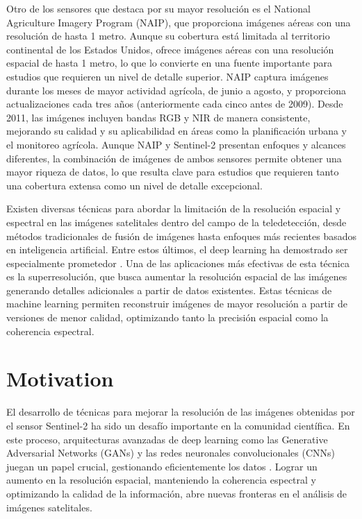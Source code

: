 Otro de los sensores que destaca por su mayor resolución es el National Agriculture Imagery Program (NAIP), que proporciona imágenes aéreas con una resolución de hasta 1 metro. Aunque su cobertura está limitada al territorio continental de los Estados Unidos, ofrece imágenes aéreas con una resolución espacial de hasta 1 metro, lo que lo convierte en una fuente importante para estudios que requieren un nivel de detalle superior. NAIP captura imágenes durante los meses de mayor actividad agrícola, de junio a agosto, y proporciona actualizaciones cada tres años (anteriormente cada cinco antes de 2009). Desde 2011, las imágenes incluyen bandas RGB y NIR de manera consistente, mejorando su calidad y su aplicabilidad en áreas como la planificación urbana y el monitoreo agrícola. Aunque NAIP y Sentinel-2 presentan enfoques y alcances diferentes, la combinación de imágenes de ambos sensores permite obtener una mayor riqueza de datos, lo que resulta clave para estudios que requieren tanto una cobertura extensa como un nivel de detalle excepcional.

Existen diversas técnicas para abordar la limitación de la resolución espacial y espectral en las imágenes satelitales dentro del campo de la teledetección, desde métodos tradicionales de fusión de imágenes hasta enfoques más recientes basados en inteligencia artificial. Entre estos últimos, el deep learning ha demostrado ser especialmente prometedor \autocite{gargiulo2019fast}. Una de las aplicaciones más efectivas de esta técnica es la superresolución, que busca aumentar la resolución espacial de las imágenes generando detalles adicionales a partir de datos existentes. Estas técnicas de machine learning permiten reconstruir imágenes de mayor resolución a partir de versiones de menor calidad, optimizando tanto la precisión espacial como la coherencia espectral.

\section{Motivation}

El desarrollo de técnicas para mejorar la resolución de las imágenes obtenidas por el sensor Sentinel-2 ha sido un desafío importante en la comunidad científica. En este proceso, arquitecturas avanzadas de deep learning como las Generative Adversarial Networks (GANs) y las redes neuronales convolucionales (CNNs) juegan un papel crucial, gestionando eficientemente los datos \autocite{salgueiro2020super}. Lograr un aumento en la resolución espacial, manteniendo la coherencia espectral y optimizando la calidad de la información, abre nuevas fronteras en el análisis de imágenes satelitales.

